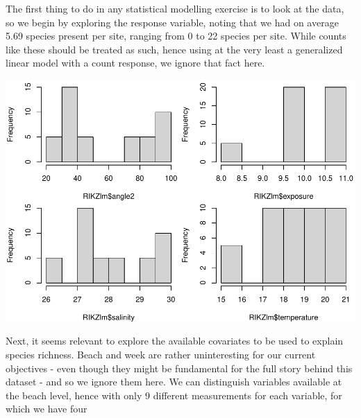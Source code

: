 \documentclass[
]{book}
\newenvironment{Shaded}{\begin{snugshade}}{\end{snugshade}}
\newcommand{\AttributeTok}[1]{\textcolor[rgb]{0.13,0.29,0.53}{#1}}
\newcommand{\DecValTok}[1]{\textcolor[rgb]{0.00,0.00,0.81}{#1}}
\newcommand{\FloatTok}[1]{\textcolor[rgb]{0.00,0.00,0.81}{#1}}
\newcommand{\FunctionTok}[1]{\textcolor[rgb]{0.13,0.29,0.53}{\textbf{#1}}}
\newcommand{\NormalTok}[1]{#1}
\newcommand{\SpecialCharTok}[1]{\textcolor[rgb]{0.81,0.36,0.00}{\textbf{#1}}}
\newcommand{\StringTok}[1]{\textcolor[rgb]{0.31,0.60,0.02}{#1}}
\begin{document}
The first thing to do in any statistical modelling exercise is to look at the data, so we begin by exploring the response variable, noting that we had on average 5.69 species present per site, ranging from 0 to 22 species per site. While counts like these should be treated as such, hence using at the very least a generalized linear model with a count response, we ignore that fact here.

\begin{Shaded}
\end{Shaded}

\includegraphics{ECOMODbook_files/figure-latex/unnamed-chunk-14-1.pdf}

Next, it seems relevant to explore the available covariates to be used to explain species richness. Beach and week are rather uninteresting for our current objectives - even though they might be fundamental for the full story behind this dataset - and so we ignore them here. We can distinguish variables available at the beach level, hence with only 9 different measurements for each variable, for which we have four

\begin{Shaded}
\end{Shaded}
\end{document}
